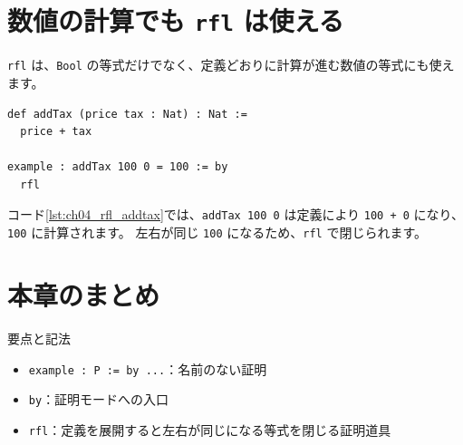 \section{数値の計算でも \texttt{rfl} は使える}

\texttt{rfl} は、\texttt{Bool} の等式だけでなく、定義どおりに計算が進む数値の等式にも使えます。

\begin{listing}[htbp]
\begin{verbatim}
def addTax (price tax : Nat) : Nat :=
  price + tax

example : addTax 100 0 = 100 := by
  rfl
\end{verbatim}
\caption{\texttt{addTax 100 0 = 100}}
\label{lst:ch04_rfl_addtax}
\end{listing}

コード\ref{lst:ch04_rfl_addtax}では、\texttt{addTax 100 0} は定義により \texttt{100 + 0} になり、\texttt{100} に計算されます。
左右が同じ \texttt{100} になるため、\texttt{rfl} で閉じられます。

\section{本章のまとめ}

要点と記法
\begin{itemize}
\item \texttt{example : P := by ...}：名前のない証明
\item \texttt{by}：証明モードへの入口
\item \texttt{rfl}：定義を展開すると左右が同じになる等式を閉じる証明道具
\end{itemize}
